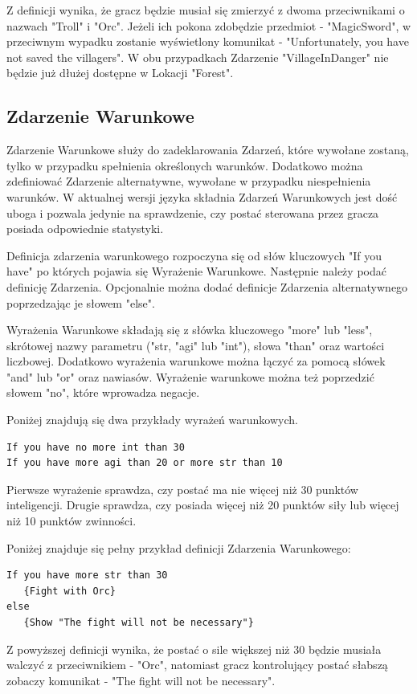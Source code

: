 \documentclass{xmgr}
\begin{document}
Z definicji wynika, że gracz będzie musiał się zmierzyć z dwoma przeciwnikami o nazwach "Troll" i "Orc". Jeżeli ich pokona zdobędzie przedmiot - "MagicSword", w przeciwnym wypadku zostanie wyświetlony komunikat - "Unfortunately, you have not saved the villagers". W obu przypadkach Zdarzenie "VillageInDanger" nie będzie już dłużej dostępne w Lokacji "Forest".

\subsection{Zdarzenie Warunkowe}
Zdarzenie Warunkowe służy do zadeklarowania Zdarzeń, które wywołane zostaną, tylko w przypadku spełnienia określonych warunków. Dodatkowo można zdefiniować Zdarzenie alternatywne, wywołane w przypadku niespełnienia warunków. W aktualnej wersji języka składnia Zdarzeń Warunkowych jest dość uboga i pozwala jedynie na sprawdzenie, czy postać sterowana przez gracza posiada odpowiednie statystyki.

Definicja zdarzenia warunkowego rozpoczyna się od słów kluczowych "If you have" po których pojawia się Wyrażenie Warunkowe. Następnie należy podać definicję Zdarzenia. Opcjonalnie można dodać definicje Zdarzenia alternatywnego poprzedzając je słowem "else".

Wyrażenia Warunkowe składają się z słówka kluczowego "more" lub "less", skrótowej nazwy parametru ("str, "agi" lub "int"), słowa "than" oraz wartości liczbowej. Dodatkowo wyrażenia warunkowe można łączyć za pomocą słówek "and" lub "or" oraz nawiasów. Wyrażenie warunkowe można też poprzedzić słowem "no", które wprowadza negacje.

Poniżej znajdują się dwa przykłady wyrażeń warunkowych.
\begin{lstlisting}
If you have no more int than 30
If you have more agi than 20 or more str than 10
\end{lstlisting}

Pierwsze wyrażenie sprawdza, czy postać ma nie więcej niż 30 punktów inteligencji. Drugie sprawdza, czy posiada więcej niż 20 punktów siły lub więcej niż 10 punktów zwinności.

Poniżej znajduje się pełny przykład definicji Zdarzenia Warunkowego: 
\begin{lstlisting}
If you have more str than 30 
   {Fight with Orc}
else 
   {Show "The fight will not be necessary"}
\end{lstlisting}

Z powyższej definicji wynika, że postać o sile większej niż 30 będzie musiała walczyć z przeciwnikiem - "Orc", natomiast gracz kontrolujący postać słabszą zobaczy komunikat - "The fight will not be necessary".
\end{document}
